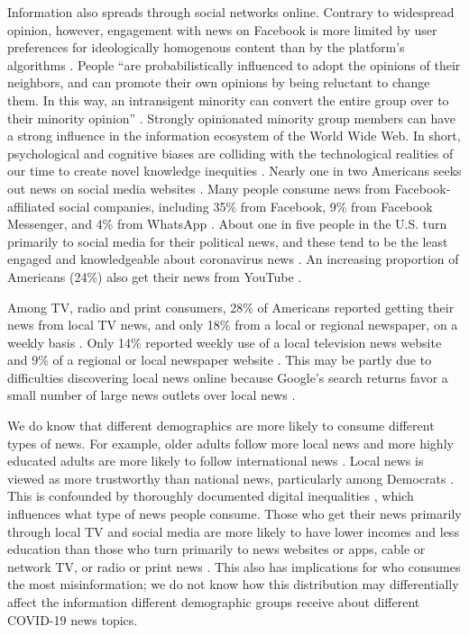 \documentclass[11pt]{article}
\begin{document}
Information also spreads through social networks online. Contrary to widespread opinion, however, engagement with news on Facebook is more limited by user preferences for ideologically homogenous content than by the platform's algorithms \citep{Bakshy2015}. People ``are probabilistically influenced to adopt the opinions of their neighbors, and can promote their own opinions by being reluctant to change them. In this way, an intransigent minority can convert the entire group over to their minority opinion'' \citep{West2011}. Strongly opinionated minority group members can have a strong influence in the information ecosystem of the World Wide Web. In short, psychological and cognitive biases \citep{DiMaggio1997} are colliding with the technological realities of our time to create novel knowledge inequities \citep{Mohammed2012}. Nearly one in two Americans seeks out news on social media websites \citep{Reuters2020}. Many people consume news from Facebook-affiliated social companies, including 35\% from Facebook, 9\% from Facebook Messenger, and 4\% from WhatsApp \citep[87]{Reuters2020}. About one in five people in the U.S. turn primarily to social media for their political news, and these tend to be the least engaged and knowledgeable about coronavirus news \citep{Mitchell2020a}. An increasing proportion of Americans (24\%) also get their news from YouTube \cite{Shearer2017,Reuters2020}.

Among TV, radio and print consumers, 28\% of Americans reported getting their news from local TV news, and only 18\% from a local or regional newspaper, on a weekly basis \citep{Reuters2020}. Only 14\% reported weekly use of a local television news website and 9\% of a regional or local newspaper website \citep{Reuters2020}. This may be partly due to difficulties discovering local news online because Google's search returns favor a small number of large news outlets over local news \citep{Diakopoulos2019,Fischer2020}.

We do know that different demographics are more likely to consume different types of news. For example, older adults follow more local news and more highly educated adults are more likely to follow international news \citep{Mitchell2018}. Local news is viewed as more trustworthy than national news, particularly among Democrats \citep{KnightGallup2019,Reuters2020}. This is confounded by thoroughly documented digital inequalities \citep{Robinson2020a}, which influences what type of news people consume. Those who get their news primarily through local TV and social media are more likely to have lower incomes and less education than those who turn primarily to news websites or apps, cable or network TV, or radio or print news \citep{Mitchell2020a}. This also has implications for who consumes the most misinformation; we do not know how this distribution may differentially affect the information different demographic groups receive about different COVID-19 news topics. 
\end{document}
